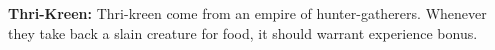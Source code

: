 


\textbf{Thri-Kreen:} Thri-kreen come from an empire of hunter-gatherers. Whenever they take back a slain creature for food, it should warrant experience bonus.







